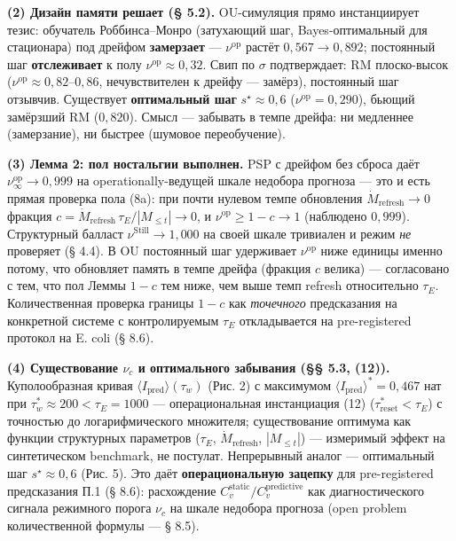 \documentclass[pdflatex,sn-mathphys-ay]{sn-jnl}
\begin{document}
\textbf{(2) Дизайн памяти решает (§ 5.2).} OU-симуляция прямо инстанциирует тезис: обучатель Роббинса--Монро (затухающий шаг, Bayes-оптимальный для стационара) под дрейфом \textbf{замерзает} --- \(\nu^{\text{op}}\) растёт \(0{,}567 \to 0{,}892\); постоянный шаг \textbf{отслеживает} к полу \(\nu^{\text{op}} \approx 0{,}32\). Свип по \(\sigma\) подтверждает: RM плоско-высок (\(\nu^{\text{op}} \approx 0{,}82\)--\(0{,}86\), нечувствителен к дрейфу --- замёрз), постоянный шаг отзывчив. Существует \textbf{оптимальный шаг} \(s^\star \approx 0{,}6\) (\(\nu^{\text{op}} = 0{,}290\)), бьющий замёрзший RM (\(0{,}820\)). Смысл --- забывать в темпе дрейфа: ни медленнее (замерзание), ни быстрее (шумовое переобучение).



\textbf{(3) Лемма 2: пол ностальгии выполнен.} PSP с дрейфом без сброса даёт \(\nu^{\text{op}}_\infty \to 0{,}999\) на operationally-ведущей шкале недобора прогноза --- это и есть прямая проверка пола (8a): при почти нулевом темпе обновления \(\dot M_{\text{refresh}} \to 0\) фракция \(c = \dot M_{\text{refresh}}\,\tau_E/|M_{\le t}| \to 0\), и \(\nu^{\text{op}} \ge 1 - c \to 1\) (наблюдено \(0{,}999\)). Структурный балласт \(\nu^{\text{Still}} \to 1{,}000\) на своей шкале тривиален и режим \emph{не} проверяет (§ 4.4). В OU постоянный шаг удерживает \(\nu^{\text{op}}\) ниже единицы именно потому, что обновляет память в темпе дрейфа (фракция \(c\) велика) --- согласовано с тем, что пол Леммы \(1-c\) тем ниже, чем выше темп refresh относительно \(\tau_E\). Количественная проверка границы \(1-c\) как \emph{точечного} предсказания на конкретной системе с контролируемым \(\tau_E\) откладывается на pre-registered протокол на E. coli (§ 8.6).



\textbf{(4) Существование \(\nu_c\) и оптимального забывания (§§ 5.3, (12)).} Куполообразная кривая \(\langle I_{\text{pred}} \rangle(\tau_w)\) (Рис. 2) с максимумом \(\langle I_{\text{pred}}\rangle^* = 0{,}467\) нат при \(\tau_w^* \approx 200 < \tau_E = 1000\) --- операциональная инстанциация (12) (\(\tau_{\text{reset}}^* < \tau_E\)) с точностью до логарифмического множителя; существование оптимума как функции структурных параметров (\(\tau_E\), \(\dot M_{\text{refresh}}\), \(|M_{\le t}|\)) --- измеримый эффект на синтетическом benchmark, не постулат. Непрерывный аналог --- оптимальный шаг \(s^\star \approx 0{,}6\) (Рис. 5). Это даёт \textbf{операциональную зацепку} для pre-registered предсказания П.1 (§ 8.6): расхождение \(C_v^{\text{static}}/C_v^{\text{predictive}}\) как диагностического сигнала режимного порога \(\nu_c\) на шкале недобора прогноза (open problem количественной формулы --- § 8.5).
\end{document}
